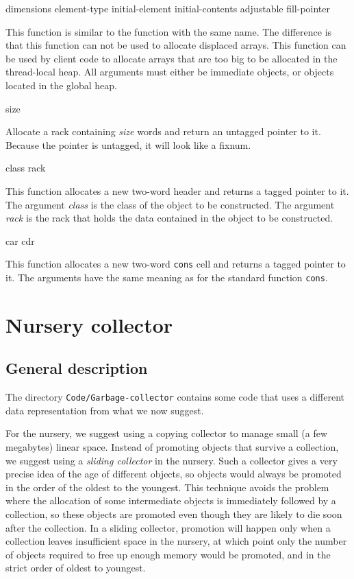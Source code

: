 {dimensions \key element-type initial-element
  initial-contents adjustable fill-pointer}

This function is similar to the \commonlisp{} function with the same
name.  The difference is that this function can not be used to
allocate displaced arrays.  This function can be used by client code
to allocate arrays that are too big to be allocated in the
thread-local heap.  All arguments must either be immediate objects, or
objects located in the global heap.

 {size}

Allocate a rack containing \textit{size} words and return an untagged
pointer to it.  Because the pointer is untagged, it will look like a
fixnum.

 {class rack}

This function allocates a new two-word header and returns a tagged
pointer to it.  The argument \textit{class} is the class of the object
to be constructed.  The argument \textit{rack} is the rack that holds
the data contained in the object to be constructed.

 {car cdr}

This function allocates a new two-word \texttt{cons} cell and returns
a tagged pointer to it.  The arguments have the same meaning as for
the standard \commonlisp{} function \texttt{cons}.

\section{Nursery collector}

\subsection{General description}

The directory \texttt{Code/Garbage-collector} contains some code that
uses a different data representation from what we now suggest.  

For the nursery, we suggest using a copying collector to manage small
(a few megabytes) linear space.  Instead of promoting objects that
survive a collection, we suggest using a \emph{sliding collector} in
the nursery.  Such a collector gives a very precise idea of the age of
different objects, so objects would always be promoted in the order of
the oldest to the youngest.  This technique avoids the problem where
the allocation of some intermediate objects is immediately followed by
a collection, so these objects are promoted even though they are
likely to die soon after the collection.  In a sliding collector,
promotion will happen only when a collection leaves insufficient space
in the nursery, at which point only the number of objects required to
free up enough memory would be promoted, and in the strict order of
oldest to youngest.

